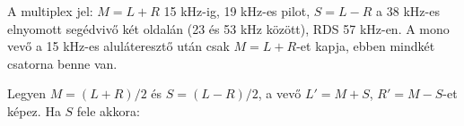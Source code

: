 A multiplex jel: $M=L+R$ 15 kHz-ig, 19 kHz-es pilot, $S=L-R$ a 38 kHz-es elnyomott segédvivő két oldalán (23 és 53 kHz között), RDS 57 kHz-en. A mono vevő a 15 kHz-es aluláteresztő után csak $M=L+R$-et kapja, ebben mindkét csatorna benne van.

Legyen $M=(L+R)/2$ és $S=(L-R)/2$, a vevő $L'=M+S$, $R'=M-S$-et képez. Ha $S$ fele akkora:

\begin{center}\end{center}

\begin{center}\end{center}

